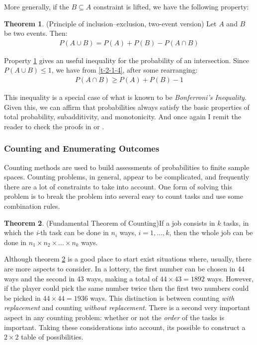 \documentclass[
  oneside,
  11pt, a4paper,
  footinclude=true,
  headinclude=true,
  cleardoublepage=empty
]{scrbook}
\theoremstyle{definition}
\theoremstyle{definition}
\newtheorem{theorem}{Theorem}[section]
\begin{document}
            More generally, if the $B \subseteq A$ constraint is lifted, we have the following property:
            \begin{theorem}{(Principle of inclusion–exclusion, two-event version) Let $A$ and $B$ be two events. Then:}\label{2-1-4}
                \begin{align}\label{t-2-1-4}
                    P(A \cup B) = P(A) + P(B) - P(A \cap B)
                \end{align}{}
            \end{theorem}
            
            Property \ref{2-1-4} gives an useful inequality for the probability of an intersection. Since $P(A \cup B) \leq 1$, we have from \ref{t-2-1-4}, after some rearranging:
            \begin{align}\label{al-6}
                P(A \cap B) \geq P(A) + P(B) - 1
            \end{align}{}
            
            This inequality is a special case of what is known to be \emph{Bonferroni's Inequality}.
            Given this, we can affirm that probabilities always satisfy the basic properties of total probability, subadditivity, and monotonicity. And once again I remit the reader to check the proofs in \cite{CaseBerg:01} or \cite{RePEc:bes:amstat:v:59:y:2005:m:august:p:276-276}.
            
        \subsubsection{Counting and Enumerating Outcomes}
        
        Counting methods are used to build assessments of probabilities to finite sample spaces. Counting problems, in general, appear to be complicated, and frequently there are a lot of constraints to take into account. One form of solving this problem is to break the problem into several easy to count tasks and use some combination rules.
        
        \begin{theorem}{(Fundamental Theorem of Counting)}\label{t-2-1-5}
            If a job consists in $k$ tasks, in which the \emph{i}-th task can be done in $n_i$ ways, $i = 1,...,k$, then the whole job can be done in $n_1 \times n_2 \times ... \times n_k$ ways.
        \end{theorem}{}
        
        Although theorem \ref{t-2-1-5} is a good place to start exist situations where, usually, there are more aspects to consider. In a lottery, the first number can be chosen in 44 ways and the second in 43 ways, making a total of $44 \times 43 = 1892$ ways. However, if the player could pick the same number twice then the first two numbers could be picked in $44 \times 44 = 1936$ ways. This distinction is between counting \emph{with replacement} and counting \emph{without replacement}. There is a second very important aspect in any counting problem: whether or not the \emph{order} of the tasks is important. Taking these considerations into account, its possible to construct a $2 \times 2$ table of possibilities.
        
\end{document}
